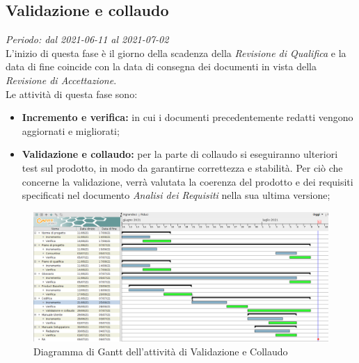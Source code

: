 \subsection{Validazione e collaudo}
\textit{Periodo: dal 2021-06-11 al 2021-07-02}\\
L’inizio di questa fase è il giorno della scadenza della \textit{Revisione di Qualifica} e la data di fine coincide con la data di consegna dei documenti in vista della \textit{Revisione di Accettazione}.\\
Le attività di questa fase sono:
\begin {itemize}
\item \textbf{Incremento e verifica:} in cui i documenti precedentemente redatti vengono aggiornati e migliorati;
\item \textbf{Validazione e collaudo:} per la parte di collaudo si eseguiranno ulteriori test sul prodotto, in modo da garantirne correttezza e stabilità. Per ciò che concerne la validazione, verrà valutata la coerenza del prodotto e dei requisiti specificati nel documento \textit{Analisi dei Requisiti} nella sua ultima versione;
\end {itemize}
\begin{figure}[!ht]
    \caption{Diagramma di Gantt dell’attività di Validazione e Collaudo}
    \vspace{5px}
    \includegraphics[scale=0.3]{../../../Images/Diagrammi/Gantt/validazione.png}
    \centering
\end{figure}